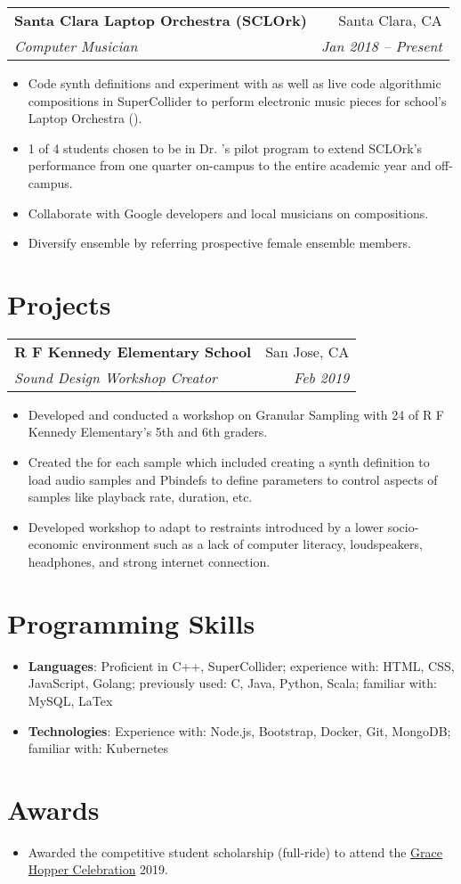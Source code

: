 \documentclass[letterpaper,11pt]{article}
\makeatletter
\newcommand{\resumeItem}[2]{
  \item\small{
    {#2 \vspace{-2pt}}
  }
}
\newcommand{\resumeSubheading}[4]{
  \vspace{-1pt}\item
    \begin{tabular*}{0.97\textwidth}{l@{\extracolsep{\fill}}r}
      \textbf{#1} & #2 \\
      \textit{\small#3} & \textit{\small #4} \\
    \end{tabular*}\vspace{-5pt}
}
\newcommand{\resumeItemListStart}{\begin{itemize}}
\newcommand{\resumeItemListEnd}{\end{itemize}\vspace{-5pt}}
\makeatother
\begin{document}
    \resumeSubheading
      {Santa Clara Laptop Orchestra (SCLOrk)}{Santa Clara, CA}
      {Computer Musician}{Jan 2018 -- Present}
      \resumeItemListStart
        \resumeItem{} {Code synth definitions and experiment with as well as live code algorithmic compositions in SuperCollider to perform electronic music pieces for school's Laptop Orchestra (\href{https://www.youtube.com/watch?v=UorZXvhU6uI}{\color{blue}{SCLOrk}}).}
        \resumeItem{}{1 of 4 students chosen to be in Dr.  \href{https://works.bepress.com/bruno-ruviaro/about/}{\color{blue}{Bruno Ruviaro}}'s pilot program to extend SCLOrk's performance from one quarter on-campus to the entire academic year and off-campus.} \resumeItem{} {Collaborate with Google developers and local musicians on compositions.}
        \resumeItem{} {Diversify ensemble by referring prospective female ensemble members.}
      \resumeItemListEnd

\section{Projects} 
    \resumeSubheading{R F Kennedy Elementary School}{San Jose, CA}
    {Sound Design Workshop Creator}{Feb 2019}
        \resumeItemListStart
        \resumeItem{}{Developed and conducted a workshop on Granular Sampling with 24 of R F Kennedy Elementary's 5th and 6th graders.}
        \resumeItem{} {Created the   \href{https://github.com/tanya-sonker/sound-design-workshop}{\color{blue}{code}} for each sample which included creating a synth definition to load audio samples and Pbindefs to define parameters to control aspects of samples like playback rate, duration, etc. }  
        \resumeItem{} {Developed workshop to adapt to restraints introduced by a lower socio-economic environment such as a lack of computer literacy, loudspeakers, headphones, and strong internet connection.}
  \resumeItemListEnd



\section{Programming Skills}
 \resumeItemListStart
   \resumeItem{}{
     \textbf{Languages}{: Proficient in C++, SuperCollider; experience with: HTML, CSS, JavaScript, Golang; previously used: C, Java, Python, Scala; familiar with: MySQL, LaTex}
     }
     \resumeItem{}{
     \textbf{Technologies}{: Experience with: Node.js, Bootstrap, Docker, Git, MongoDB; familiar with: Kubernetes}
   }
 \resumeItemListEnd

\section{Awards}
    \resumeItemListStart
\resumeItem{}{Awarded the competitive student scholarship (full-ride) to attend the \href{https://ghc.anitab.org/2019-student-academic/scholarships/} {\color{blue}Grace Hopper Celebration} 2019.}
  \resumeItemListEnd
\end{document}
